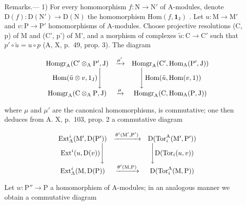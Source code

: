 Remarks.--- 1) For every homomorphism \(f: \mathrm{N} \to \mathrm{N}'\) of A-modules, denote \(\mathrm{D}(f): \mathrm{D}(\mathrm{N}') \to \mathrm{D}(\mathrm{N})\) the homomorphism \(\mathrm{Hom}(f, \mathbf{1}_{\mathrm{J}})\) . Let \(u: \mathrm{M} \to \mathrm{M}'\) and \(v: \mathrm{P} \to \mathrm{P}'\) homomorphisms of A-modules. Choose projective resolutions (C, p) of M and (C', p') of M', and a morphism of complexes \(\tilde{u}: \mathrm{C} \to \mathrm{C}'\) such that \(p' \circ \tilde{u} = u \circ p\) (A, X, p.~49, prop. 3). The diagram

\[
\begin{array}{c c c} \operatorname{Homgr} _ {\mathrm{A}} (\mathrm{C} ^ {\prime} \otimes_ {\mathrm{A}} \mathrm{P} ^ {\prime}, \mathrm{J}) & \xrightarrow {\mu^ {\prime}} & \operatorname{Homgr} _ {\mathrm{A}} (\mathrm{C} ^ {\prime}, \operatorname{Hom} _ {\mathrm{A}} (\mathrm{P} ^ {\prime}, \mathrm{J})) \\ \operatorname{Hom} (\tilde {u} \otimes v, 1 _ {\mathrm{J}}) \Bigg \downarrow & & \Bigg \downarrow \operatorname{Hom} (\tilde {u}, \operatorname{Hom} (v, 1)) \\ \operatorname{Homgr} _ {\mathrm{A}} (\mathrm{C} \otimes_ {\mathrm{A}} \mathrm{P}, \mathrm{J}) & \xrightarrow {\mu} & \operatorname{Homgr} _ {\mathrm{A}} (\mathrm{C}, \operatorname{Hom} _ {\mathrm{A}} (\mathrm{P}, \mathrm{J})) \end{array}
\]

where \(\mu\) and \(\mu'\) are the canonical homomorphisms, is commutative; one then deduces from A. X, p.~103, prop. 2 a commutative diagram

\[
\begin{array}{c c c} \operatorname{Ext} _ {\Lambda} ^ {i} (\mathrm{M} ^ {\prime}, \mathrm{D} (\mathrm{P} ^ {\prime})) & \xrightarrow {\theta^ {i} (\mathrm{M} ^ {\prime} , \mathrm{P} ^ {\prime})} & \mathrm{D} (\operatorname{Tor} _ {i} ^ {\mathrm{A}} (\mathrm{M} ^ {\prime}, \mathrm{P} ^ {\prime})) \\ \operatorname{Ext} ^ {i} (u, \mathrm{D} (v)) \Bigg \downarrow & & \Bigg \downarrow \mathrm{D} (\operatorname{Tor} _ {i} (u, v)) \\ \operatorname{Ext} _ {\Lambda} ^ {i} (\mathrm{M}, \mathrm{D} (\mathrm{P})) & \xrightarrow {\theta^ {i} (\mathrm{M} , \mathrm{P})} & \mathrm{D} (\operatorname{Tor} _ {i} ^ {\Lambda} (\mathrm{M}, \mathrm{P})) \end{array}
\]

Let \(w: \mathrm{P}'' \to \mathrm{P}\) a homomorphism of A-modules; in an analogous manner we obtain a commutative diagram

